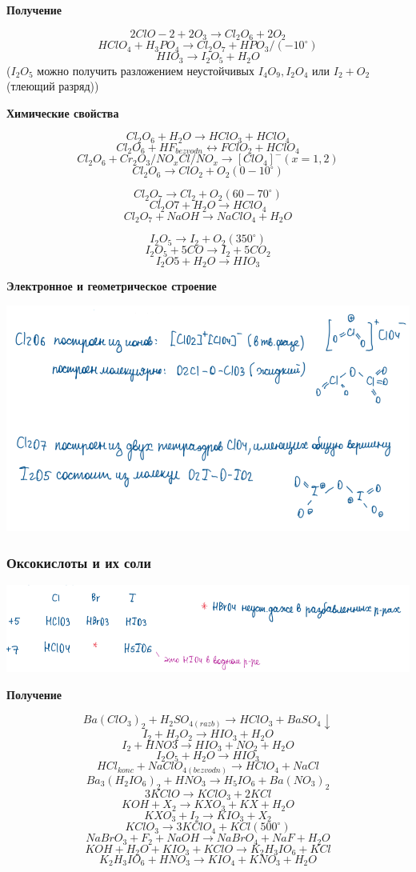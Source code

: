 \documentclass[14pt,a4paper]{scrartcl}
\begin{document}
\textbf{Получение}

$$2ClO-2 + 2O_3 \rightarrow Cl_2O_6 + 2O_2$$
$$HClO_4 + H_3PO_4 \rightarrow Cl_2O_7 + HPO_3/(-10^{\circ})$$
$$HIO_3 \rightarrow I_2O_5 + H_2O$$
($I_2O_5$ можно получить разложением неустойчивых $I_4O_9,I_2O_4$ или $I_2 + O_2$(тлеющий разряд))

\textbf{Химические свойства}

$$Cl_2O_6 + H_2O \rightarrow HClO_3 + HClO_4$$
$$Cl_2O_6 + HF_{bezvodn}\leftrightarrow FClO_2 + HClO_4$$
$$Cl_2O_6 + Cr_2O_3/NO_xCl/NO_x \rightarrow [ClO_4]^-(x=1,2)$$
$$ Cl_2O_6 \rightarrow ClO_2 + O_2(0-10^{\circ})$$

$$Cl_2O_7 \rightarrow Cl_2 + O_2(60-70^{\circ})$$
$$Cl_2O7 +H_2O \rightarrow HClO_4$$
$$Cl_2O_7 + NaOH \rightarrow NaClO_4 + H_2O$$

$$I_2O_5 \rightarrow I_2 + O_2 (350^{\circ})$$
$$I_2O_5 + 5CO \rightarrow I_2 + 5CO_2$$
$$I_2O5 + H_2O \rightarrow HIO_3$$

\textbf{Электронное и геометрическое строение}

\includegraphics[scale=0.9]{5v3.png}

\subsubsection{Оксокислоты и их соли}

\includegraphics{5v4.png}

\textbf{Получение}

$$Ba(ClO_3)_2 + H_2SO_{4(razb)} \rightarrow HClO_3 + BaSO_4\downarrow$$
$$ I_2  + H_2O_2 \rightarrow HIO_3 + H_2O$$
$$I_2 + HNO3 \rightarrow HIO_3 + NO_2 + H_2O$$
$$I_2O_5 + H_2O \rightarrow HIO_3$$
$$HCl_{konc} + NaClO_{4(bezvodn)} \rightarrow HClO_4 + NaCl$$
$$Ba_3(H_2IO_6)_2 + HNO_3 \rightarrow H_5IO_6 + Ba(NO_3)_2$$
$$3KClO \rightarrow KClO_3 + 2KCl$$
$$KOH + X_2 \rightarrow KXO_3 + KX + H_2O$$
$$KXO_3 + I_2 \rightarrow KIO_3 + X_2$$
$$KClO_3\rightarrow 3KClO_4 + KCl (500^{\circ})$$
$$NaBrO_3 + F_2 + NaOH \rightarrow NaBrO_4 + NaF + H_2O$$
$$KOH + H_2O +KIO_3 + KClO \rightarrow K_2H_3IO_6 + KCl$$
$$K_2H_3IO_6 + HNO_3 \rightarrow KIO_4 + KNO_3 + H_2O$$
\end{document}
